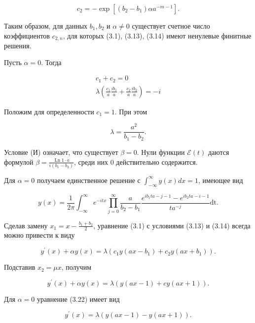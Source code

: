 \documentclass[10pt]{article}
\begin{document}
\begin{equation*}
c_{2}=-\exp \left[\left(b_{2}-b_{1}\right) \alpha a^{-m-1}\right] . \tag{3.18}
\end{equation*}


Таким образом, для данных $b_{1}, b_{2}$ и $\alpha \neq 0$ существует счетное число коэффициентов $c_{2, n}$, для которых (3.1), (3.13), (3.14) имеют ненулевые финитные решения.

Пусть $\alpha=0$. Тогда


\begin{gather*}
c_{1}+c_{2}=0 \\
\lambda\left(\frac{c_{1}}{a} \frac{i b_{1}}{a}+\frac{c_{2}}{a} \frac{i b_{2}}{a}\right)=-i \tag{3.19}
\end{gather*}


Положим для определенности $c_{1}=1$. При этом


\begin{equation*}
\lambda=\frac{a^{2}}{b_{1}-b_{2}} . \tag{3.20}
\end{equation*}


Условие (И) означает, что существует $\beta=0$. Нули функции $\mathscr{E}(t)$ даются формулой $\beta=\frac{\operatorname{Ln} 1 \cdot a}{i\left(b_{1}-b_{2}\right)}$, среди них 0 действительно содержится.

Для $\alpha=0$ получаем единственное решение с $\int_{-\infty}^{\infty} y(x) d x=1$, имеющее вид


\begin{equation*}
y(x)=\frac{1}{2 \pi} \int_{-\infty}^{\infty} e^{-i t x} \prod_{j=0}^{\infty} \frac{a}{b_{2}-b_{1}} \frac{e^{i b_{1} t a-j-1}-e^{i b_{2} t a-i-1}}{t a^{-j}} \mathrm{dt} . \tag{3.21}
\end{equation*}


Сделав замену $x_{1}=x-\frac{b_{1}+b_{2}}{2}$, уравнение (3.1) с условиями (3.13) и (3.14) всегда можно привести к виду

$$
y^{\prime}(x)+\alpha y(x)=\lambda\left(c_{1} y\left(a x-b_{1}\right)+c_{2} y\left(a x+b_{1}\right)\right) .
$$

Подставив $x_{2}=\mu x$, получим


\begin{equation*}
y^{\prime}(x)+\alpha y(x)=\lambda(y(a x-1)+c y(a x+1)) . \tag{3.22}
\end{equation*}


Для $\alpha=0$ уравнение (3.22) имеет вид


\begin{equation*}
y^{\prime}(x)=\lambda(y(a x-1)-y(a x+1)) . \tag{3.23}
\end{equation*}
\end{document}
